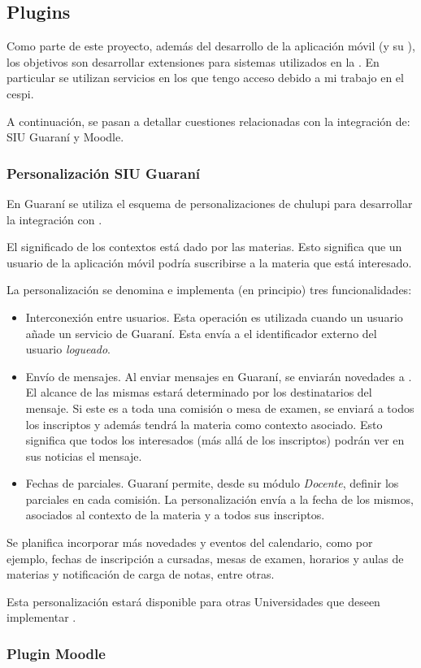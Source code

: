 \subsection{Plugins}
\label{desarrollo_plugins}

Como parte de este proyecto, además del desarrollo de la aplicación móvil (y su ), los objetivos son desarrollar extensiones para sistemas utilizados en la \unlp{}. En particular se utilizan servicios en los que tengo acceso debido a mi trabajo en el \gls{cespi}.

A continuación, se pasan a detallar cuestiones relacionadas con la integración de: SIU Guaraní y Moodle.

\subsubsection{Personalización SIU Guaraní}
\label{desarrollo_plugins_guarani}

En Guaraní se utiliza el esquema de personalizaciones de \gls{chulupi} para desarrollar la integración con \nombreApp{}. 

El significado de los contextos está dado por las materias. Esto significa que un usuario de la aplicación móvil podría suscribirse a la materia que está interesado.

La personalización se denomina  e implementa (en principio) tres funcionalidades:
\begin{itemize}
\item Interconexión entre usuarios. Esta operación es utilizada cuando un usuario añade un servicio de Guaraní. Esta envía a \nombreApp{} el identificador externo del usuario \textit{logueado}.
\item Envío de mensajes. Al enviar mensajes en Guaraní, se enviarán novedades a \nombreApp{}. El alcance de las mismas estará determinado por los destinatarios del mensaje. Si este es a toda una comisión o mesa de examen, se enviará a todos los inscriptos y además tendrá la materia como contexto asociado. Esto significa que todos los interesados (más allá de los inscriptos) podrán ver en sus noticias el mensaje.
\item Fechas de parciales. Guaraní permite, desde su módulo \textit{Docente}, definir los parciales en cada comisión. La personalización envía a \nombreApp{} la fecha de los mismos, asociados al contexto de la materia y a todos sus inscriptos. 
\end{itemize}

Se planifica incorporar más novedades y eventos del calendario, como por ejemplo, fechas de inscripción a cursadas, mesas de examen, horarios y aulas de materias y notificación de carga de notas, entre otras.

Esta personalización estará disponible para otras Universidades que deseen implementar \nombreApp{}.

\subsubsection{Plugin Moodle}
\label{desarrollo_plugins_moodle}


